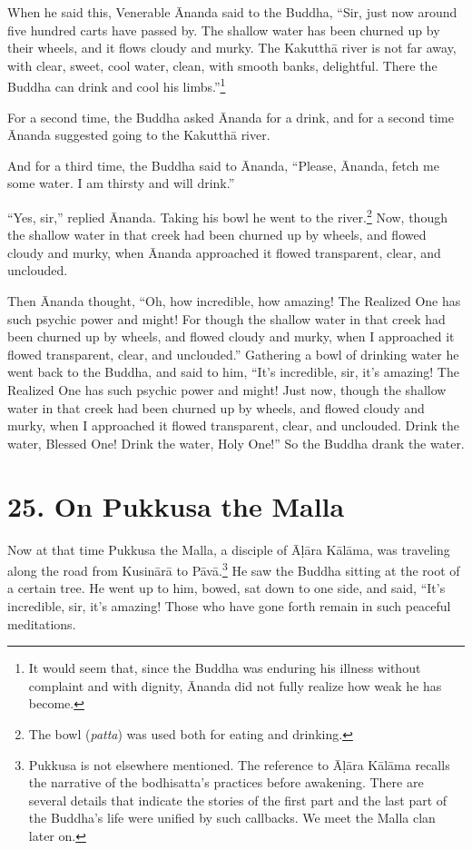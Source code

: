 \documentclass[12pt,openany]{book}%
\begin{document}
When he said this, Venerable Ānanda said to the Buddha, “Sir, just now around five hundred carts have passed by. The shallow water has been churned up by their wheels, and it flows cloudy and murky. The \textsanskrit{Kakutthā} river is not far away, with clear, sweet, cool water, clean, with smooth banks, delightful. There the Buddha can drink and cool his limbs.”\footnote{It would seem that, since the Buddha was enduring his illness without complaint and with dignity, Ānanda did not fully realize how weak he has become. } 

For a second time, the Buddha asked Ānanda for a drink, and for a second time Ānanda suggested going to the \textsanskrit{Kakutthā} river. 

And for a third time, the Buddha said to Ānanda, “Please, Ānanda, fetch me some water. I am thirsty and will drink.” 

“Yes, sir,” replied Ānanda. Taking his bowl he went to the river.\footnote{The bowl (\textit{patta}) was used both for eating and drinking. } Now, though the shallow water in that creek had been churned up by wheels, and flowed cloudy and murky, when Ānanda approached it flowed transparent, clear, and unclouded. 

Then Ānanda thought, “Oh, how incredible, how amazing! The Realized One has such psychic power and might! For though the shallow water in that creek had been churned up by wheels, and flowed cloudy and murky, when I approached it flowed transparent, clear, and unclouded.” Gathering a bowl of drinking water he went back to the Buddha, and said to him, “It’s incredible, sir, it’s amazing! The Realized One has such psychic power and might! Just now, though the shallow water in that creek had been churned up by wheels, and flowed cloudy and murky, when I approached it flowed transparent, clear, and unclouded. Drink the water, Blessed One! Drink the water, Holy One!” So the Buddha drank the water. 

\section*{25. On Pukkusa the Malla }

Now at that time Pukkusa the Malla, a disciple of \textsanskrit{Āḷāra} \textsanskrit{Kālāma}, was traveling along the road from \textsanskrit{Kusinārā} to \textsanskrit{Pāvā}.\footnote{Pukkusa is not elsewhere mentioned. The reference to \textsanskrit{Āḷāra} \textsanskrit{Kālāma} recalls the narrative of the bodhisatta’s practices before awakening. There are several details that indicate the stories of the first part and the last part of the Buddha’s life were unified by such callbacks. We meet the Malla clan later on. } He saw the Buddha sitting at the root of a certain tree. He went up to him, bowed, sat down to one side, and said, “It’s incredible, sir, it’s amazing! Those who have gone forth remain in such peaceful meditations. 
\end{document}
